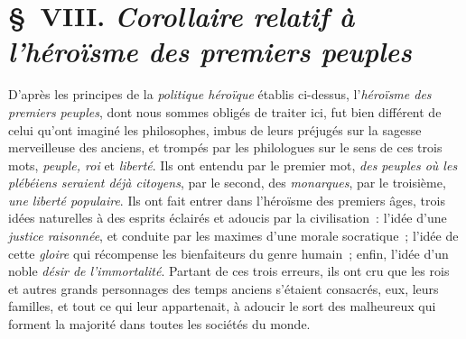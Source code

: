 \documentclass[french,twoside]{book} %
\begin{document}
\section[{§ VIII. Corollaire relatif à l’héroïsme des premiers peuples}]{§ VIII. {\itshape Corollaire relatif à l’héroïsme des premiers peuples}}
\noindent D’après les principes de la {\itshape politique héroïque} établis ci-dessus, l’{\itshape héroïsme des premiers peuples}, dont nous sommes obligés de traiter ici, fut bien différent de celui qu’ont imaginé les philosophes, imbus de leurs préjugés sur la sagesse merveilleuse des anciens, et trompés par les philologues sur le sens de ces trois mots, {\itshape peuple, roi} et {\itshape liberté}. Ils ont entendu par le premier mot, {\itshape des peuples où les plébéiens seraient déjà citoyens}, par le second, des {\itshape monarques}, par le troisième, {\itshape une liberté populaire}. Ils ont fait entrer dans l’héroïsme des premiers âges, trois idées naturelles à des esprits éclairés et adoucis par la civilisation : l’idée d’une {\itshape justice raisonnée},  et conduite par les maximes d’une morale socratique ; l’idée de cette {\itshape gloire} qui récompense les bienfaiteurs du genre humain ; enfin, l’idée d’un noble {\itshape désir de l’immortalité}. Partant de ces trois erreurs, ils ont cru que les rois et autres grands personnages des temps anciens s’étaient consacrés, eux, leurs familles, et tout ce qui leur appartenait, à adoucir le sort des malheureux qui forment la majorité dans toutes les sociétés du monde.\par
\end{document}
